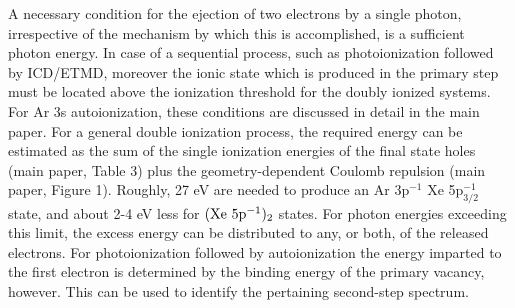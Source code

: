\documentclass[journal=jpccck,manuscript=suppinfo]{achemso}
\begin{document}
A necessary condition for the ejection of two electrons by a single photon, irrespective of the mechanism by which this is accomplished, is a sufficient photon energy. 
In case of a sequential process, such as photoionization followed by ICD/ETMD, moreover the ionic state which is produced in the primary step must be located above the ionization threshold for the doubly ionized systems.
For Ar 3s autoionization, these conditions are discussed in detail in the main paper.
For a general double ionization process, the required energy can be estimated as the sum of the single ionization energies of the final state holes (main paper, Table 3) plus the geometry-dependent Coulomb repulsion (main paper, Figure 1).
Roughly, 27 eV are needed to produce an Ar 3p$^{-1}$ Xe 5p$_{3/2}^{-1}$ state, and about 2-4 eV less for $\rm (Xe\ 5p^{-1})_2$ states.
For photon energies exceeding this limit, the excess energy can be distributed to any, or both, of the released electrons.
For photoionization followed by autoionization the energy imparted to the first electron is determined by the binding energy of the primary vacancy, however.
This can be used to identify the pertaining second-step spectrum.
\end{document}
